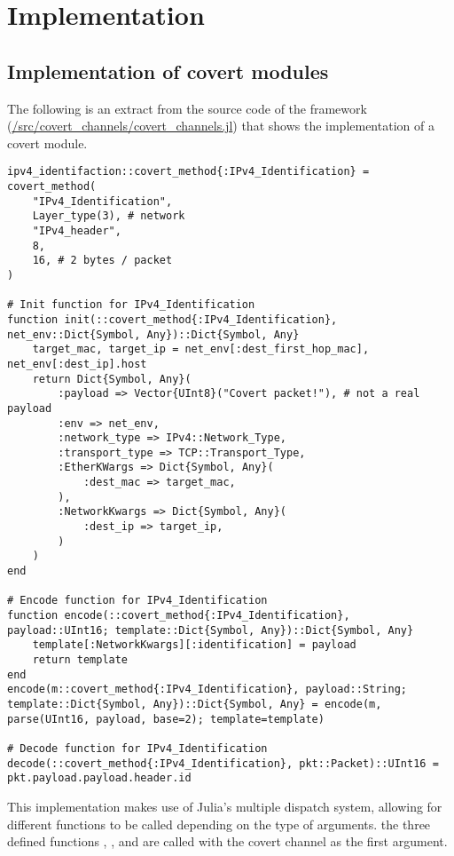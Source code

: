 \chapter{Implementation}

\section{Implementation of covert modules}
\label{sec:impl_cov_mod}

The following is an extract from the source code of the framework (\url{/src/covert_channels/covert_channels.jl}) that shows the implementation of a covert module.

\begin{lstlisting}[language=JuliaLocal, style=julia]
ipv4_identifaction::covert_method{:IPv4_Identification} = covert_method(
    "IPv4_Identification",
    Layer_type(3), # network
    "IPv4_header",
    8,
    16, # 2 bytes / packet
)

# Init function for IPv4_Identification
function init(::covert_method{:IPv4_Identification}, net_env::Dict{Symbol, Any})::Dict{Symbol, Any}
    target_mac, target_ip = net_env[:dest_first_hop_mac], net_env[:dest_ip].host
    return Dict{Symbol, Any}(
        :payload => Vector{UInt8}("Covert packet!"), # not a real payload
        :env => net_env,
        :network_type => IPv4::Network_Type,
        :transport_type => TCP::Transport_Type,
        :EtherKWargs => Dict{Symbol, Any}(
            :dest_mac => target_mac,
        ),
        :NetworkKwargs => Dict{Symbol, Any}(
            :dest_ip => target_ip,
        )
    )
end

# Encode function for IPv4_Identification
function encode(::covert_method{:IPv4_Identification}, payload::UInt16; template::Dict{Symbol, Any})::Dict{Symbol, Any}
    template[:NetworkKwargs][:identification] = payload
    return template
end
encode(m::covert_method{:IPv4_Identification}, payload::String; template::Dict{Symbol, Any})::Dict{Symbol, Any} = encode(m, parse(UInt16, payload, base=2); template=template)

# Decode function for IPv4_Identification
decode(::covert_method{:IPv4_Identification}, pkt::Packet)::UInt16 = pkt.payload.payload.header.id
\end{lstlisting}

This implementation makes use of Julia's multiple dispatch system, allowing for different functions to be called depending on the type of arguments. the three defined functions , , and  are called with the covert channel as the first argument.


